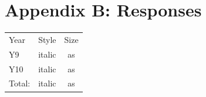 \documentclass[a4paper,openany,nobib]{tufte-book}
\begin{document}
\chapter{Appendix B: Responses}
\begin{margintable}
  \begin{center}
    \begin{tabular}{lcc}
      \toprule
      Year & Style & Size\\
      Y9 & italic & as\\
      Y10 & italic & as\\
      \bottomrule
      Total: & italic & as\\
    \end{tabular}
  \end{center}
\end{margintable}
\nocite{*}
\printbibliography[heading=bibintoc]
\end{document}
